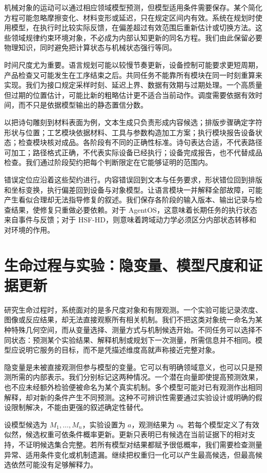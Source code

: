 机械对象的运动可以通过相应领域模型预测，但模型适用条件需要保存。某个简化方程可能忽略摩擦变化、材料变形或延迟，只在规定区间内有效。系统在规划时使用模型，在执行时比较实际反馈，在偏差超过有效范围后重新估计或切换方法。这些领域规律约束环境对象，不必成为内部认知更新的同名方程。我们由此保留必要物理知识，同时避免把计算状态与机械状态强行等同。

时间尺度尤为重要。语言规划可能以较慢节奏更新，设备控制可能要求更短周期，产品检查又可能发生在工序结束之后。共同任务不能靠所有模块在同一时刻重算来实现。我们为接口规定采样时刻、延迟上界、数据有效期与过期处理。一个高质量但过期的位置估计，可能比新的粗略估计更不适合当前动作。调度需要依据有效时间，而不只是依据模型输出的静态置信分数。

以把诗句雕刻到材料表面为例，文本生成只负责形成内容候选；排版步骤确定字符形状与位置；工艺模块依据材料、工具与参数构造加工方案；执行模块报告设备状态；检查模块核对成品。各阶段有不同的正确性标准。诗句表达合适，不代表路径可加工；路径格式正确，不代表实际设备已经执行；设备完成报告，也不代替成品检查。我们通过阶段契约把每个判断限定在它能够证明的范围内。

错误定位应沿着这些契约进行。内容错误回到文本与任务要求，形状错位回到排版和坐标变换，执行偏差回到设备与对象模型。让语言模块一并解释全部故障，可能产生看似合理却无法指导修复的叙述。我们保存各阶段的输入版本、输出记录与检查结果，使修复只重做必要依赖。对于 AgentOS，这意味着长期任务的执行状态来自事件与反馈；对于 HSF-HD，则意味着跨域动力学必须区分内部状态转移和对环境的作用。

\section{生命过程与实验：隐变量、模型尺度和证据更新}
\label{sec:manifold_of_biochem}

研究生命过程时，系统面对的是多尺度对象和有限观测。一个实验可能记录浓度、图像或反应结果，却无法直接观察所有相关机制。我们不把这类对象统一命名为某种特殊几何空间，而从变量选择、测量方式与机制候选开始。不同任务可以选择不同状态：预测某个实验结果、解释机制或规划下一次测量，所需信息并不相同。模型应说明它服务的目标，而不是凭描述维度高就声称接近完整对象。

隐变量是未被直接观测但参与模型的变量。它可以有明确领域意义，也可以只是预测所需的内部表示。我们分别标记这两种情况。一个潜在向量即使提高预测效果，也不应未经额外检验便被命名为某个真实机制。多个模型可能对已有观测作出相同解释，却对新的条件产生不同预测。这种不可辨识性需要通过实验设计或明确的假设限制解决，不能由更强的叙述确定性替代。

设模型候选为 $M_1,\ldots,M_n$，实验设置为 $a$，观测结果为 $o$。若每个模型定义了有效似然，候选权重可依条件概率更新。更新只表明已有候选在当前证据下的相对支持，不证明候选集合完整。若所有模型对结果都赋予很低概率，我们需要检查测量异常、适用条件变化或机制遗漏。继续把权重归一化可以产生最高候选，但最高候选依然可能没有足够解释力。

